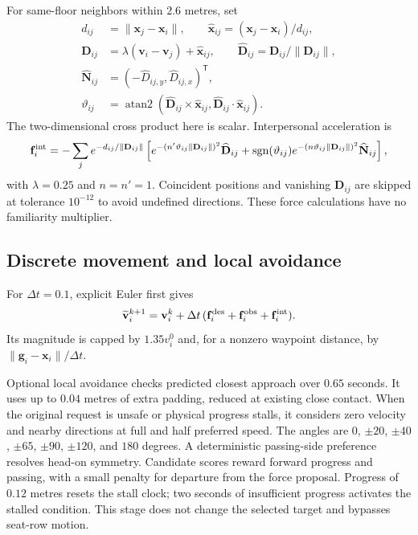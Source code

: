 \documentclass[11pt]{article}
\begin{document}
For same-floor neighbors within $2.6$ metres, set
\begin{align}
 d_{ij}&=\|\mathbf x_j-\mathbf x_i\|,\qquad
 \widehat{\mathbf x}_{ij}=(\mathbf x_j-\mathbf x_i)/d_{ij},\\
 \mathbf D_{ij}&=\lambda(\mathbf v_i-\mathbf v_j)+\widehat{\mathbf x}_{ij},
 \qquad\widehat{\mathbf D}_{ij}=\mathbf D_{ij}/\|\mathbf D_{ij}\|,\\
 \widehat{\mathbf N}_{ij}&=(-\widehat D_{ij,y},\widehat D_{ij,x})^{\mathsf T},\\
 \vartheta_{ij}&=\operatorname{atan2}
   (\widehat{\mathbf D}_{ij}\mathbin{\times}\widehat{\mathbf x}_{ij},
    \widehat{\mathbf D}_{ij}\cdot\widehat{\mathbf x}_{ij}).
\end{align}
The two-dimensional cross product here is scalar. Interpersonal acceleration is
\[
 \mathbf f_i^{\rm int}=-\sum_j e^{-d_{ij}/\|\mathbf D_{ij}\|}
 \left[
 e^{-(n'\vartheta_{ij}\|\mathbf D_{ij}\|)^2}\widehat{\mathbf D}_{ij}
 +\operatorname{sgn}(\vartheta_{ij})
  e^{-(n\vartheta_{ij}\|\mathbf D_{ij}\|)^2}\widehat{\mathbf N}_{ij}
 \right],
\]
with $\lambda=0.25$ and $n=n'=1$. Coincident positions and vanishing
$\mathbf D_{ij}$ are skipped at tolerance $10^{-12}$ to avoid undefined
directions. These force calculations have no familiarity multiplier.

\subsection{Discrete movement and local avoidance}

For $\Delta t=0.1$, explicit Euler first gives
\[
 \widetilde{\mathbf v}_i^{k+1}
 =\mathbf v_i^k+\Delta t\,
       (\mathbf f_i^{\rm des}+\mathbf f_i^{\rm obs}+\mathbf f_i^{\rm int}).
\]
Its magnitude is capped by $1.35v_i^0$ and, for a nonzero waypoint distance,
by $\|\mathbf g_i-\mathbf x_i\|/\Delta t$.

Optional local avoidance checks predicted closest approach over $0.65$ seconds.
It uses up to $0.04$ metres of extra padding, reduced at existing close contact.
When the original request is unsafe or physical progress stalls, it considers
zero velocity and nearby directions at full and half preferred speed. The
angles are $0$, $\pm20$, $\pm40$, $\pm65$, $\pm90$, $\pm120$, and $180$ degrees.
A deterministic passing-side preference resolves head-on symmetry. Candidate
scores reward forward progress and passing, with a small penalty for departure
from the force proposal. Progress of $0.12$ metres resets the stall clock;
two seconds of insufficient progress activates the stalled condition.
This stage does not change the selected target and bypasses seat-row motion.
\end{document}

